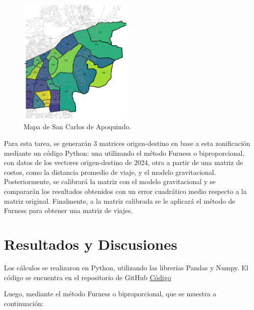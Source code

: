 \documentclass[letterpaper,12pt]{article}
\begin{document}
\begin{figure}[h!]
    \centering
    \includegraphics[width=0.5\textwidth]{fotos/mapa.png}
    \caption{Mapa de San Carlos de Apoquindo.}
    \label{fig:mapa}
\end{figure}

Para esta tarea, se generarán 3 matrices origen-destino en base a esta zonificación mediante un código Python: una utilizando el método Furness o biproporcional, con datos de los vectores origen-destino de 2024, otra a partir de una matriz de costos, como la distancia promedio de viaje, y el modelo gravitacional. Posteriormente, se calibrará la matriz con el modelo gravitacional y se compararán los resultados obtenidos con un error cuadrático medio respecto a la matriz original. Finalmente, a la matriz calibrada se le aplicará el método de Furness para obtener una matriz de viajes.

\newpage

\section{Resultados y Discusiones}
Los cálculos se realizaron en Python, utilizando las librerías Pandas y Numpy. El código se encuentra en el repositorio de GitHub \href{https://github.com/berckanala/T3_autitos/blob/main/t3.py}{Código}


    
Luego, mediante el método Furness o biproporcional, que se muestra a continuación:
\end{document}
